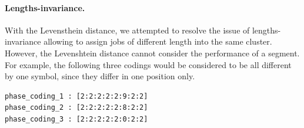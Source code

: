 \documentclass{jhps}
\begin{document}

\medskip

\paragraph{Lengths-invariance.}
With the Levensthein distance, we attempted to resolve the issue of lengths-invariance allowing to assign jobs of different length into the same cluster.
However, the Levenshtein distance cannot consider the performance of a segment.
For example, the following three codings would be considered to be all different by one symbol, since they differ in one position only.

\begin{lstlisting}
phase_coding_1 : [2:2:2:2:2:9:2:2]
phase_coding_2 : [2:2:2:2:2:8:2:2]
phase_coding_3 : [2:2:2:2:2:0:2:2]
\end{lstlisting}
\end{document}
